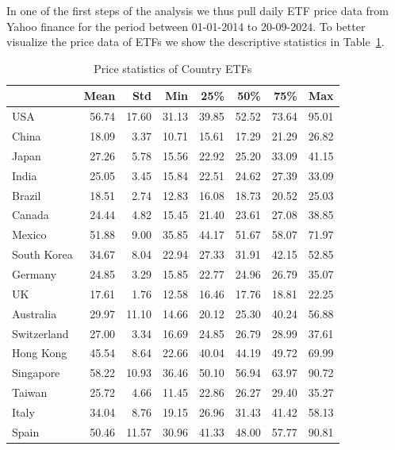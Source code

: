 \documentclass[a4paper,12pt,twoside]{article}
\begin{document}
In one of the first steps of the analysis we thus pull daily ETF price data from Yahoo finance for the period between 01-01-2014 to 20-09-2024.  To better visualize the price data of ETFs we show the descriptive statistics in Table~\ref{tab:summary_stats_price}.

\begin{table}[h!]
\centering
\begin{tabular}{lrrrrrrr}
\hline
\textbf{} & \textbf{Mean} & \textbf{Std} & \textbf{Min} & \textbf{25\%} & \textbf{50\%} & \textbf{75\%} & \textbf{Max} \\
\hline
USA         &  56.74 &  17.60 & 31.13 & 39.85 & 52.52 & 73.64 & 95.01 \\
China       &  18.09 &   3.37 & 10.71 & 15.61 & 17.29 & 21.29 & 26.82 \\
Japan       &  27.26 &   5.78 & 15.56 & 22.92 & 25.20 & 33.09 & 41.15 \\
India       &  25.05 &   3.45 & 15.84 & 22.51 & 24.62 & 27.39 & 33.09 \\
Brazil      &  18.51 &   2.74 & 12.83 & 16.08 & 18.73 & 20.52 & 25.03 \\
Canada      &  24.44 &   4.82 & 15.45 & 21.40 & 23.61 & 27.08 & 38.85 \\
Mexico      &  51.88 &   9.00 & 35.85 & 44.17 & 51.67 & 58.07 & 71.97 \\
South Korea &  34.67 &   8.04 & 22.94 & 27.33 & 31.91 & 42.15 & 52.85 \\
Germany     &  24.85 &   3.29 & 15.85 & 22.77 & 24.96 & 26.79 & 35.07 \\
UK          &  17.61 &   1.76 & 12.58 & 16.46 & 17.76 & 18.81 & 22.25 \\
Australia   &  29.97 &  11.10 & 14.66 & 20.12 & 25.30 & 40.24 & 56.88 \\
Switzerland &  27.00 &   3.34 & 16.69 & 24.85 & 26.79 & 28.99 & 37.61 \\
Hong Kong   &  45.54 &   8.64 & 22.66 & 40.04 & 44.19 & 49.72 & 69.99 \\
Singapore   &  58.22 &  10.93 & 36.46 & 50.10 & 56.94 & 63.97 & 90.72 \\
Taiwan      &  25.72 &   4.66 & 11.45 & 22.86 & 26.27 & 29.40 & 35.27 \\
Italy       &  34.04 &   8.76 & 19.15 & 26.96 & 31.43 & 41.42 & 58.13 \\
Spain       &  50.46 &  11.57 & 30.96 & 41.33 & 48.00 & 57.77 & 90.81 \\
\hline
\end{tabular}
\caption{Price statistics of Country ETFs}
\label{tab:summary_stats_price}
\end{table}
\end{document}
